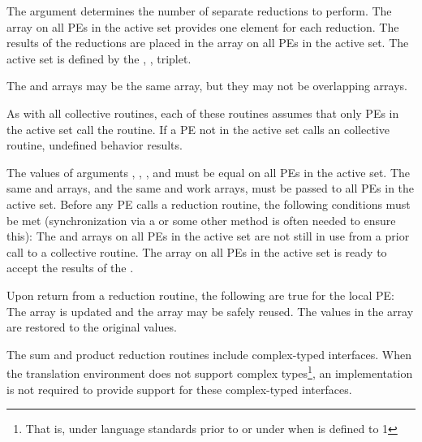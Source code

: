 \begin{apidefinition}
{    The  argument determines the number of separate reductions to
    perform.  The \source{} array on all \acp{PE} in the active set provides one
    element for each reduction.  The results of the reductions are placed in the
    \dest{} array on all \acp{PE} in the active set.  The active set is defined
    by the , ,  triplet.

    The \source{} and \dest{} arrays may be the same array, but they may not be
    overlapping arrays.

    As with all \openshmem collective routines, each of these routines assumes
    that only \acp{PE} in the active set call the routine.  If a \ac{PE} not in
    the active set calls an \openshmem collective routine, undefined behavior
    results.

    The values of arguments , , , and
     must be equal on all \acp{PE} in the active set. The same \dest{}
    and \source{} arrays, and the same  and  work arrays, must
    be passed to all \acp{PE} in the active set.
    Before any \ac{PE} calls a reduction routine, the
    following conditions must be met (synchronization via a  or some other
    method is often needed to ensure this): The  and  arrays
    on all \acp{PE} in the active set are not still in use from a prior call to a
    collective \openshmem routine.  The \dest{} array on all \acp{PE} in the
    active set is ready to accept the results of the .

    Upon return from a reduction routine, the following are true for the local
    \ac{PE}: The \dest{} array is updated and the \source{} array may be safely reused.
    The values in the  array are
    restored to the original values.

    The sum and product reduction routines include complex-typed
    interfaces. When the \Cstd translation environment does not support
    complex types\footnote{That is, under \Cstd language standards prior
    to \Cstd[99] or under \Cstd[11] when
     is defined to 1}, an \openshmem
    implementation is not required to provide support for these
    complex-typed interfaces.
}



\end{apidefinition}
